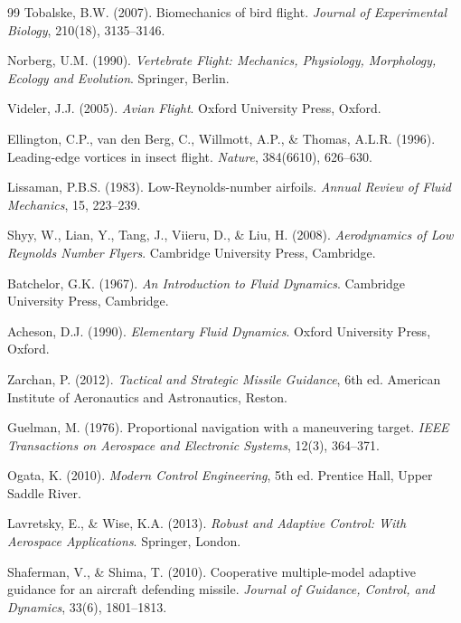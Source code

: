 ﻿\documentclass[12pt,a4paper]{article}
\theoremstyle{remark}
\begin{document}
\begin{thebibliography}{99}
		Tobalske, B.W. (2007). Biomechanics of bird flight. \textit{Journal of Experimental Biology}, 210(18), 3135--3146.

		Norberg, U.M. (1990). \textit{Vertebrate Flight: Mechanics, Physiology, Morphology, Ecology and Evolution}. Springer, Berlin.

		Videler, J.J. (2005). \textit{Avian Flight}. Oxford University Press, Oxford.

		Ellington, C.P., van den Berg, C., Willmott, A.P., \& Thomas, A.L.R. (1996). Leading-edge vortices in insect flight. \textit{Nature}, 384(6610), 626--630.


		Lissaman, P.B.S. (1983). Low-Reynolds-number airfoils. \textit{Annual Review of Fluid Mechanics}, 15, 223--239.

		Shyy, W., Lian, Y., Tang, J., Viieru, D., \& Liu, H. (2008). \textit{Aerodynamics of Low Reynolds Number Flyers}. Cambridge University Press, Cambridge.

		Batchelor, G.K. (1967). \textit{An Introduction to Fluid Dynamics}. Cambridge University Press, Cambridge.

		Acheson, D.J. (1990). \textit{Elementary Fluid Dynamics}. Oxford University Press, Oxford.


		Zarchan, P. (2012). \textit{Tactical and Strategic Missile Guidance}, 6th ed. American Institute of Aeronautics and Astronautics, Reston.

		Guelman, M. (1976). Proportional navigation with a maneuvering target. \textit{IEEE Transactions on Aerospace and Electronic Systems}, 12(3), 364--371.

		Ogata, K. (2010). \textit{Modern Control Engineering}, 5th ed. Prentice Hall, Upper Saddle River.

		Lavretsky, E., \& Wise, K.A. (2013). \textit{Robust and Adaptive Control: With Aerospace Applications}. Springer, London.

		Shaferman, V., \& Shima, T. (2010). Cooperative multiple-model adaptive guidance for an aircraft defending missile. \textit{Journal of Guidance, Control, and Dynamics}, 33(6), 1801--1813.


\end{thebibliography}
\end{document}
